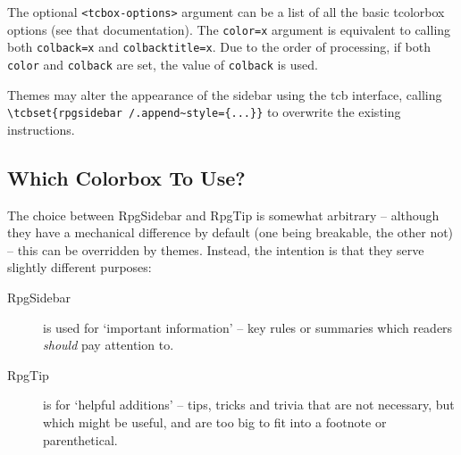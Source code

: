 \begin{macrolist}
{				The optional \verb|<tcbox-options>| argument can be a list of all the basic tcolorbox options (see that documentation). The \verb|color=x| argument is equivalent to calling both \verb|colback=x| and \verb|colbacktitle=x|. Due to the order of processing, if both \verb|color| and \verb|colback| are set, the value of \verb|colback| is used.
		 

				Themes may alter the appearance of the sidebar using the tcb interface, calling \verb|\tcbset{rpgsidebar /.append~style={...}}| to overwrite the existing instructions.
			}
		\end{macrolist}

		

		\subsection{Which Colorbox To Use?}

			The choice between RpgSidebar and RpgTip is somewhat arbitrary -- although they have a mechanical difference by default (one being breakable, the other not) -- this can be overridden by themes. Instead, the intention is that they serve slightly different purposes:

			\begin{description}
				\item[RpgSidebar] is used for `important information' -- key rules or summaries which readers \textit{should} pay attention to.
				\item[RpgTip] is for `helpful additions' -- tips, tricks and trivia that are not necessary, but which might be useful, and are too big to fit into a footnote or parenthetical.   
			\end{description}
